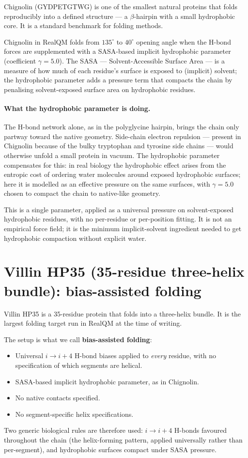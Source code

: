 Chignolin (GYDPETGTWG) is one of the smallest natural proteins that folds reproducibly into a defined structure --- a $\beta$-hairpin with a small hydrophobic core. It is a standard benchmark for folding methods.

Chignolin in RealQM folds from $135^\circ$ to $40^\circ$ opening angle when the H-bond forces are supplemented with a SASA-based implicit hydrophobic parameter (coefficient $\gamma = 5.0$). The SASA --- Solvent-Accessible Surface Area --- is a measure of how much of each residue's surface is exposed to (implicit) solvent; the hydrophobic parameter adds a pressure term that compacts the chain by penalising solvent-exposed surface area on hydrophobic residues.

\paragraph{What the hydrophobic parameter is doing.}
The H-bond network alone, as in the polyglycine hairpin, brings the chain only partway toward the native geometry. Side-chain electron repulsion --- present in Chignolin because of the bulky tryptophan and tyrosine side chains --- would otherwise unfold a small protein in vacuum. The hydrophobic parameter compensates for this: in real biology the hydrophobic effect arises from the entropic cost of ordering water molecules around exposed hydrophobic surfaces; here it is modelled as an effective pressure on the same surfaces, with $\gamma = 5.0$ chosen to compact the chain to native-like geometry.

This is a single parameter, applied as a universal pressure on solvent-exposed hydrophobic residues, with no per-residue or per-position fitting. It is not an empirical force field; it is the minimum implicit-solvent ingredient needed to get hydrophobic compaction without explicit water.

\section{Villin HP35 (35-residue three-helix bundle): bias-assisted folding}\label{sec:villin}

Villin HP35 is a 35-residue protein that folds into a three-helix bundle. It is the largest folding target run in RealQM at the time of writing.

The setup is what we call \textbf{bias-assisted folding}:
\begin{itemize}
\item Universal $i \to i{+}4$ H-bond biases applied to \emph{every} residue, with no specification of which segments are helical.
\item SASA-based implicit hydrophobic parameter, as in Chignolin.
\item No native contacts specified.
\item No segment-specific helix specifications.
\end{itemize}
Two generic biological rules are therefore used: $i \to i{+}4$ H-bonds favoured throughout the chain (the helix-forming pattern, applied universally rather than per-segment), and hydrophobic surfaces compact under SASA pressure.

